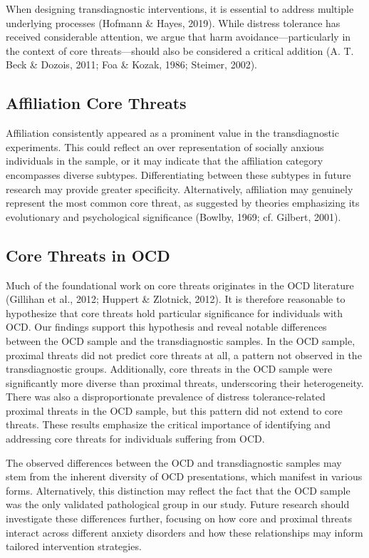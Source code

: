\documentclass[
  man,floatsintext]{apa7}
\begin{document}
When designing transdiagnostic interventions, it is essential to address multiple underlying processes (Hofmann \& Hayes, 2019).
While distress tolerance has received considerable attention, we argue that harm avoidance---particularly in the context of core threats---should also be considered a critical addition (A. T. Beck \& Dozois, 2011; Foa \& Kozak, 1986; Steimer, 2002).

\subsection{Affiliation Core Threats}\label{affiliation-core-threats}

Affiliation consistently appeared as a prominent value in the transdiagnostic experiments.
This could reflect an over representation of socially anxious individuals in the sample, or it may indicate that the affiliation category encompasses diverse subtypes.
Differentiating between these subtypes in future research may provide greater specificity.
Alternatively, affiliation may genuinely represent the most common core threat, as suggested by theories emphasizing its evolutionary and psychological significance (Bowlby, 1969; cf. Gilbert, 2001).

\subsection{Core Threats in OCD}\label{core-threats-in-ocd}

Much of the foundational work on core threats originates in the OCD literature (Gillihan et al., 2012; Huppert \& Zlotnick, 2012).
It is therefore reasonable to hypothesize that core threats hold particular significance for individuals with OCD.
Our findings support this hypothesis and reveal notable differences between the OCD sample and the transdiagnostic samples.
In the OCD sample, proximal threats did not predict core threats at all, a pattern not observed in the transdiagnostic groups.
Additionally, core threats in the OCD sample were significantly more diverse than proximal threats, underscoring their heterogeneity.
There was also a disproportionate prevalence of distress tolerance-related proximal threats in the OCD sample, but this pattern did not extend to core threats.
These results emphasize the critical importance of identifying and addressing core threats for individuals suffering from OCD.

The observed differences between the OCD and transdiagnostic samples may stem from the inherent diversity of OCD presentations, which manifest in various forms.
Alternatively, this distinction may reflect the fact that the OCD sample was the only validated pathological group in our study.
Future research should investigate these differences further, focusing on how core and proximal threats interact across different anxiety disorders and how these relationships may inform tailored intervention strategies.
\end{document}
